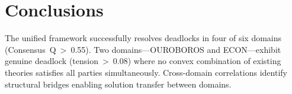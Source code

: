 \documentclass{article}
\begin{document}
\section{Conclusions}
The unified framework successfully resolves deadlocks in four of six domains (Consensus~Q~>~0.55). Two domains---OUROBOROS and ECON---exhibit genuine deadlock (tension~>~0.08) where no convex combination of existing theories satisfies all parties simultaneously. Cross-domain correlations identify structural bridges enabling solution transfer between domains.
\end{document}
